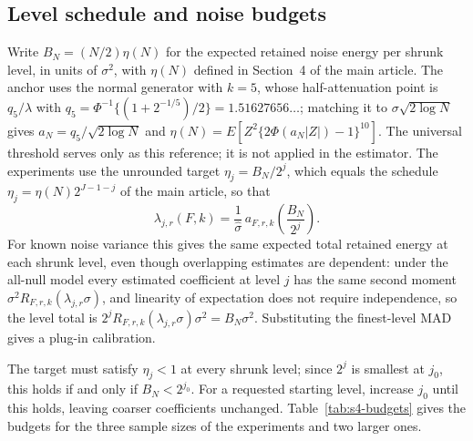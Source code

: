\documentclass[11pt]{article}
\numberwithin{equation}{section}
\begin{document}
\subsection{Level schedule and noise budgets}
\label{sec:s4-energy}
Write $B_N=(N/2)\eta(N)$ for the expected retained noise energy per shrunk level, in units of $\sigma^2$, with $\eta(N)$ defined in Section~4 of the main article. The anchor uses the normal generator with $k=5$, whose half-attenuation point is $q_5/\lambda$ with $q_5=\Phi^{-1}\{(1+2^{-1/5})/2\}=1.51627656\ldots$; matching it to $\sigma\sqrt{2\log N}$ \citep{DonohoJohnstone1994} gives $a_N=q_5/\sqrt{2\log N}$ and $\eta(N)=E[Z^2\{2\Phi(a_N|Z|)-1\}^{10}]$. The universal threshold serves only as this reference; it is not applied in the estimator. The experiments use the unrounded target $\eta_j=B_N/2^j$, which equals the schedule $\eta_j=\eta(N)2^{J-1-j}$ of the main article, so that
\begin{equation}
\lambda_{j,r}(F,k)=\frac{1}{\widehat\sigma}\,a_{F,r,k}\!\left(\frac{B_N}{2^j}\right).
\label{eq:s4-direct}
\end{equation}
For known noise variance this gives the same expected total retained energy at each shrunk level, even though overlapping estimates are dependent: under the all-null model every estimated coefficient at level $j$ has the same second moment $\sigma^2R_{F,r,k}(\lambda_{j,r}\sigma)$, and linearity of expectation does not require independence, so the level total is $2^jR_{F,r,k}(\lambda_{j,r}\sigma)\sigma^2=B_N\sigma^2$. Substituting the finest-level MAD gives a plug-in calibration.

The target must satisfy $\eta_j<1$ at every shrunk level; since $2^j$ is smallest at $j_0$, this holds if and only if $B_N<2^{j_0}$. For a requested starting level, increase $j_0$ until this holds, leaving coarser coefficients unchanged. Table~\ref{tab:s4-budgets} gives the budgets for the three sample sizes of the experiments and two larger ones.
\end{document}
